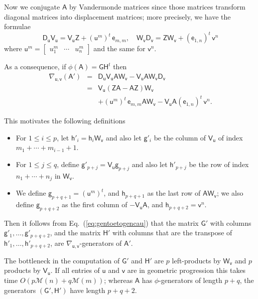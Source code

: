 \documentclass{sig-alternate}
\newcommand{\ve}{\ensuremath{\mathsf{e}}}
\newcommand{\vg}{\ensuremath{\mathsf{g}}}
\newcommand{\vh}{\ensuremath{\mathsf{h}}}
\newcommand{\vu}{\ensuremath{\mathsf{u}}}
\newcommand{\vv}{\ensuremath{\mathsf{v}}}
\newcommand{\mA}{\ensuremath{\mathsf{A}}}
\newcommand{\mD}{\ensuremath{\mathsf{D}}}
\newcommand{\mG}{\ensuremath{\mathsf{G}}}
\newcommand{\mH}{\ensuremath{\mathsf{H}}}
\newcommand{\mV}{\ensuremath{\mathsf{V}}}
\newcommand{\mW}{\ensuremath{\mathsf{W}}}
\newcommand{\mZ}{\ensuremath{\mathsf{Z}}}
\newcommand{\M}{\ensuremath{\mathscr{M}}}
\begin{document}
Now we conjugate $\mA$ by Vandermonde matrices since those matrices transform
diagonal matrices into displacement matrices; more precisely, we have the
formulae
\[
  \mD_{\vu}  \mV_{\vu} = \mV_{\vu}  \mZ + (\vu^m)^t \, \ve_{m,m}, \quad
  \mW_{\vv}  \mD_{\vv} = \mZ  \mW_{\vv} + (\ve_{1,n})^t \, \vv^n
\]
where $\vu^m = \begin{bmatrix} u_1^m & \cdots & u_n^m \end{bmatrix}$ and the
same for $\vv^n$.

As a
consequence, if $\phi(\mA)=\mG \mH^t$ then
\begin{eqnarray}
  \nabla_{\vu, \vv} \left( \mathsf{A}' \right) & = & \mD_{\vu}  \mV_{\vu} 
  \mathsf{A}  \mW_{\vv} - \mV_{\vu}  \mathsf{A}  \mW_{\vv}  \mD_{\vv} \nonumber \\
  & = & \mV_{\vu}  \left( \mZ  \mathsf{A} - \mathsf{A}  \mZ \right) \mW_{\vv} 
  \label{eq:gentoetogencau}\\
  &   & + (\vu^m)^t \, \ve_{m,m}  \mathsf{A}  \mW_{\vv} 
        - \mV_{\vu}  \mathsf{A}  (\ve_{1,n})^t \, \vv^n . \nonumber 
\end{eqnarray}

This motivates the following definitions

\begin{itemize}
\item For $1 \le i \le p$, let $\vh'_i=\vh_i \mW_\vv$ and also let $\vg'_{i}$ be
  the column of $\mV_\vu$ of index $m_1 + \cdots +m_{i-1}+1$.
  
\item For $1 \le j \le q$, define $\vg'_{p+j} = \mV_\vu \vg_{p+j}$ and also let
  $\vh'_{p+j}$ be the row of index $n_1 + \cdots +n_j$ in $\mW_\vv$.

\item We define $\vg_{p+q+1} = (\vu^m)^t$, and $\vh_{p+q+1}$ as the last row of
  $\mA \mW_\vv$; we also define $\vg_{p+q+2}$ as the first column of
  $-\mV_\vu \mA$, and $\vh_{p+q+2} = \vv^n$.
\end{itemize}

Then it follows from Eq.~(\ref{eq:gentoetogencau}) that the matrix $\mG'$
with columns $\vg'_1,\dots,\vg'_{p+q+2}$, and the matrix $\mH'$ with columns
that are the transpose of $\vh'_1,\dots,\vh'_{p+q+2}$, are
$\nabla_{\vu,\vv}$-generators of $\mA'$.

The bottleneck in the computation of $\mG'$ and $\mH'$ are $p$
left-products by $\mW_\vv$ and $p$ products by $\mV_\vu$.  If all
entries of $\vu$ and $\vv$ are in geometric progression this takes
time $O(p \M(n) + q \M(m))$; whereas $\mA$ has $\phi$-generators of
length $p+q$, the generators $(\mG',\mH')$ have length $p+q+2$.
\end{document}
